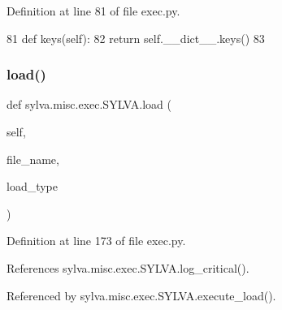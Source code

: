 Definition at line 81 of file exec.\+py.


\begin{DoxyCode}
81   \textcolor{keyword}{def }keys(self):
82     \textcolor{keywordflow}{return} self.\_\_dict\_\_.keys()
83 
\end{DoxyCode}
\mbox{\label{classsylva_1_1misc_1_1exec_1_1_s_y_l_v_a_a848ae0b83bbf7a02a22b2958dd1388f8}} 
\subsubsection{\texorpdfstring{load()}{load()}}
{\footnotesize\ttfamily def sylva.\+misc.\+exec.\+S\+Y\+L\+V\+A.\+load (\begin{DoxyParamCaption}\item[{}]{self,  }\item[{}]{file\+\_\+name,  }\item[{}]{load\+\_\+type }\end{DoxyParamCaption})}



Definition at line 173 of file exec.\+py.



References sylva.\+misc.\+exec.\+S\+Y\+L\+V\+A.\+log\+\_\+critical().



Referenced by sylva.\+misc.\+exec.\+S\+Y\+L\+V\+A.\+execute\+\_\+load().


